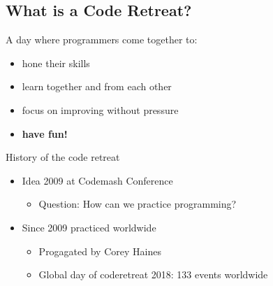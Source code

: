 \documentclass[12pt, xcolor=table, dvipsnames]{beamer}
\newcommand{\red}[1]{{\color{red}#1}}
\begin{document}
\subsection{What is a Code Retreat?}
\begin{frame}{\subsecname{}}
   A day where programmers come together to:
   \pause
	\begin{itemize}[<+->]
		\item hone their skills
		\item learn together and from each other
		\item focus on improving without pressure
		\item \textbf{\red{have fun!}}
	\end{itemize}  
\end{frame}


\begin{frame}{History of the code retreat}
	\begin{itemize}[<+->]
		\item Idea 2009 at Codemash Conference 
			\begin{itemize}[<*>]
				\item Question: How can we practice programming?
			\end{itemize}  
		\item Since 2009 practiced worldwide
			\begin{itemize}[<*>]
				\item Progagated by Corey Haines
				\item Global day of coderetreat 2018: 133 events worldwide
			\end{itemize}  
	\end{itemize}  
\end{frame}
\end{document}
